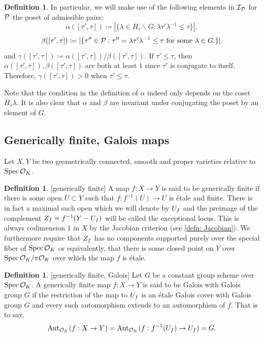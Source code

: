 \documentclass[10pt]{article}
\theoremstyle{plain}
\theoremstyle{definition}
\newtheorem{definition}[theorem]{Definition}
\numberwithin{equation}{section}
\begin{document}
\begin{definition}\label{defn: alpha, beta}
In particular, we will make use of the following elements in ${\mathcal I}_{{\mathcal P}}$ for ${\mathcal P}$ the poset of admissible pairs:
\[\alpha([\tau',\tau]) \coloneqq |\{\lambda \in H_\tau\backslash G : \lambda \tau' \lambda^{-1} \leq \tau\}|,\]
\[\beta([\tau',\tau]) \coloneqq |\{\tau'' \in {\mathcal P} : \tau'' = \lambda \tau' \lambda^{-1} \leq \tau \text{ for some } \lambda \in G.\}|.\]
and $\gamma([\tau',\tau]) \coloneqq \alpha([\tau',\tau])/\beta([\tau',\tau])$. If $\tau' \leq \tau$, then $\alpha([\tau',\tau]),\beta([\tau',\tau])$ are both at least $1$ since $\tau'$ is conjugate to itself. Therefore, $\gamma([\tau',\tau]) > 0$ when $\tau' \leq \tau$.

Note that the condition in the definition of $\alpha$ indeed only depends on the coset $H_\tau\lambda$. It is also clear that $\alpha$ and $\beta$ are invariant under conjugating the poset by an element of $G$.
\end{definition}


\subsection{Generically finite, Galois maps}

Let $X,Y$ be two geometrically connected, smooth and proper varieties relative to $\operatorname{Spec} {{\mathcal O}_{K}}$.

\begin{definition}\label{defn: generically fintie}[generically finite]
A map $f: X \to Y$ is said to be generically finite if there is some open $U \subset Y$ such that $f: f^{-1}(U) \to U$ is \'etale and finite. There is in fact a maximal such open which we will denote by $U_f$ and the preimage of the complement $Z_f = f^{-1}(Y - U_f)$ will be called the exceptional locus. This is always codimension $1$ in $X$ by the Jacobian criterion (see \ref{defn: Jacobian}). We furthermore require that $Z_f$ has no components supported purely over the special fiber of $\operatorname{Spec} {{\mathcal O}_{K}}$ or equivalently, that there is some closed point on $Y$ over $\operatorname{Spec} {{\mathcal O}_{K}}/\pi { {\mathcal O} _{K}}$ over which the map $f$ is \'etale.

\end{definition}

\begin{definition}\label{defn: generically finite, galois}[generically finite, Galois]
Let $G$ be a constant group scheme over $\operatorname{Spec} {{\mathcal O}_{K}}$. A generically finite map $f: X \to Y$ is said to be Galois with Galois group $G$ if the restriction of the map to $U_f$ is an \'etale Galois cover with Galois group $G$ and every such automorphism extends to an automorphism of $f$. That is to say,
\[\mathrm{Aut}_{{\mathcal O}_{K}}(f:X\to Y) = \mathrm{Aut}_{{\mathcal O}_{K}}(f: f^{-1}(U_f) \to U_f) = G.\] 

\end{definition}
\end{document}
